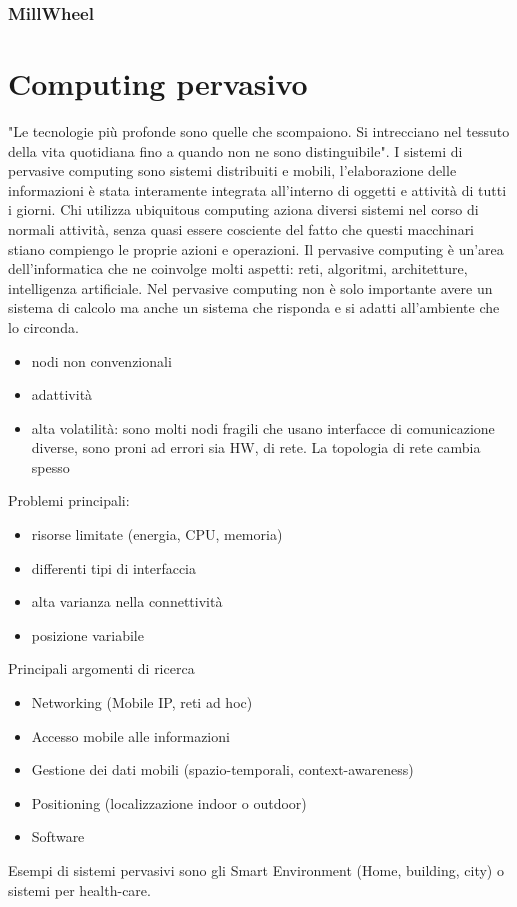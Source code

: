 \documentclass[12pt,italian]{report}
\begin{document}
\subsection{MillWheel}

\chapter{Computing pervasivo}
"Le tecnologie più profonde sono quelle che scompaiono. Si intrecciano nel tessuto della vita quotidiana fino a quando non ne sono distinguibile". 
\bigbreak
I sistemi di pervasive computing sono sistemi distribuiti e mobili, l'elaborazione delle informazioni è stata interamente integrata all'interno di oggetti e attività di tutti i giorni. Chi utilizza ubiquitous computing aziona diversi sistemi nel corso di normali attività, senza quasi essere cosciente del fatto che questi macchinari stiano compiengo le proprie azioni e operazioni. 
\bigbreak
Il pervasive computing è un'area dell'informatica che ne coinvolge molti aspetti: reti, algoritmi, architetture, intelligenza artificiale. Nel pervasive computing non è solo importante avere un sistema di calcolo ma anche un sistema che risponda e si adatti all'ambiente che lo circonda. 
\begin{itemize}
    \item nodi non convenzionali
    \item adattività
    \item alta volatilità: sono molti nodi fragili che usano interfacce di comunicazione diverse, sono proni ad errori sia HW, di rete. La topologia di rete cambia spesso 
\end{itemize}
\noindent Problemi principali:
\begin{itemize}
    \item risorse limitate (energia, CPU, memoria)
    \item differenti tipi di interfaccia
    \item alta varianza nella connettività
    \item posizione variabile
\end{itemize}
\noindent Principali argomenti di ricerca
\begin{itemize}
    \item Networking (Mobile IP, reti ad hoc)
    \item Accesso mobile alle informazioni
    \item Gestione dei dati mobili (spazio-temporali, context-awareness)
    \item Positioning (localizzazione indoor o outdoor)
    \item Software
\end{itemize}
Esempi di sistemi pervasivi sono gli Smart Environment (Home, building, city) o sistemi per health-care. 
\end{document}

